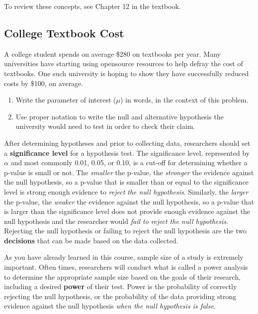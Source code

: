\documentclass[
]{report}
\begin{document}
To review these concepts, see Chapter 12 in the textbook.

\subsection{College Textbook Cost}\label{college-textbook-cost}

A college student spends on average \$280 on textbooks per year. Many universities have starting using opensource resources to help defray the cost of textbooks. One such university is hoping to show they have successfully reduced costs by \$100, on average.

\begin{enumerate}
\def\labelenumi{\arabic{enumi}.}
\item
  Write the parameter of interest (\(\mu\)) in words, in the context of this problem.
  \vspace{0.5in}
\item
  Use proper notation to write the null and alternative hypothesis the university would need to test in order to check their claim.
  \vspace{0.5in}
\end{enumerate}

After determining hypotheses and prior to collecting data, researchers should set a \textbf{significance level} for a hypothesis test. The significance level, represented by \(\alpha\) and most commonly 0.01, 0.05, or 0.10, is a cut-off for determining whether a p-value is small or not. The \emph{smaller} the p-value, the \emph{stronger} the evidence against the null hypothesis, so a p-value that is smaller than or equal to the significance level is strong enough evidence to \emph{reject the null hypothesis}. Similarly, the \emph{larger} the p-value, the \emph{weaker} the evidence against the null hypothesis, so a p-value that is larger than the significance level does not provide enough evidence against the null hypothesis and the researcher would \emph{fail to reject the null hypothesis}. Rejecting the null hypothesis or failing to reject the null hypothesis are the two \textbf{decisions} that can be made based on the data collected.

As you have already learned in this course, sample size of a study is extremely important. Often times, researchers will conduct what is called a power analysis to determine the appropriate sample size based on the goals of their research, including a desired \textbf{power} of their test. Power is the probability of correctly rejecting the null hypothesis, or the probability of the data providing strong evidence against the null hypothesis \emph{when the null hypothesis is false}.
\end{document}
